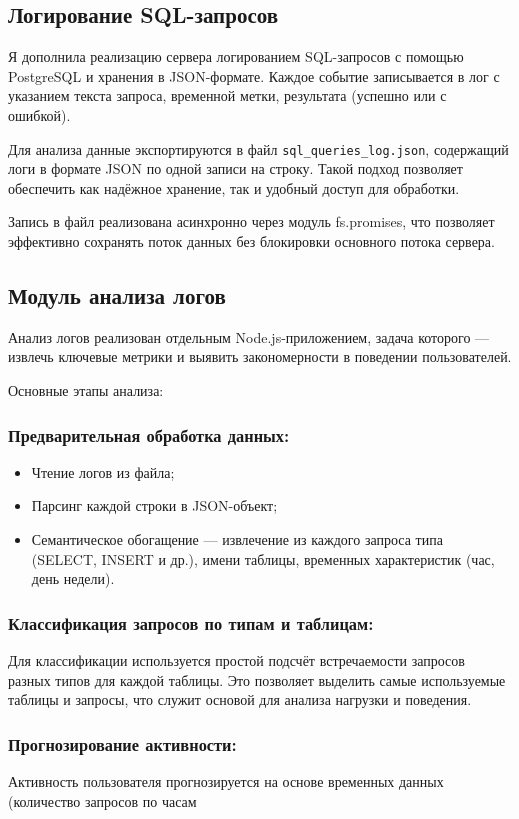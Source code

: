 \documentclass[14pt]{extarticle}
\begin{document}
\subsection{Логирование SQL-запросов}
Я дополнила реализацию сервера логированием SQL-запросов с помощью PostgreSQL и хранения в JSON-формате. Каждое событие записывается в лог с указанием текста запроса, временной метки, результата (успешно или с ошибкой).

Для анализа данные экспортируются в файл \texttt{sql\_queries\_log.json}, содержащий логи в формате JSON по одной записи на строку. Такой подход позволяет обеспечить как надёжное хранение, так и удобный доступ для обработки.

Запись в файл реализована асинхронно через модуль fs.promises, что позволяет эффективно сохранять поток данных без блокировки основного потока сервера.

\subsection{Модуль анализа логов}
Анализ логов реализован отдельным Node.js-приложением, задача которого — извлечь ключевые метрики и выявить закономерности в поведении пользователей.

Основные этапы анализа:

\subsubsection*{Предварительная обработка данных:}
\begin{itemize}
    \item Чтение логов из файла;
    \item Парсинг каждой строки в JSON-объект;
    \item Семантическое обогащение — извлечение из каждого запроса типа (SELECT, INSERT и др.), имени таблицы, временных характеристик (час, день недели).
\end{itemize}

\subsubsection*{Классификация запросов по типам и таблицам:}
Для классификации используется простой подсчёт встречаемости запросов разных типов для каждой таблицы. Это позволяет выделить самые используемые таблицы и запросы, что служит основой для анализа нагрузки и поведения.

\subsubsection*{Прогнозирование активности:}
Активность пользователя прогнозируется на основе временных данных (количество запросов по часам
\end{document}
